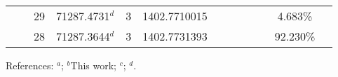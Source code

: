 \begin{table*}
\begin{center}
{\begin{tabular}{:l;l;c;l;c;l;c;l;l;c;c;c;c}
\rowstyle{\itshape}               &        & 29        & 71287.4731$^{d}$                 & 3 &  1402.7710015      &      & $                                        $ & $                                        $ &             &              & 4.683\%   & $     ^{}     $\\
\rowstyle{\itshape}               &        & 28        & 71287.3644$^{d}$                 & 3 &  1402.7731393      &      & $                                        $ & $                                        $ &             &              & 92.230\%  & $     ^{}     $\\
\hline
\end{tabular}
}
{\footnotesize References:
$^{a}$\citet{Griesmann:2000:L113};
$^{b}$This work;
$^{c}$\citet{Dzuba:2007:062510};
$^{d}$\citet{Berengut:2003:022502}.}
\end{center}
\end{table*}
